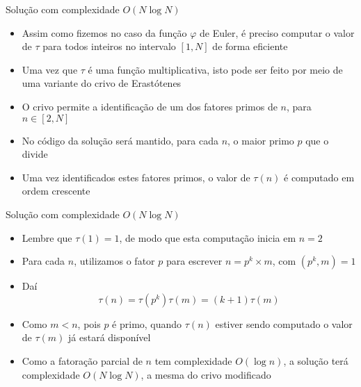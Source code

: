 \begin{frame}[fragile]{Solução com complexidade $O(N\log N)$}

    \begin{itemize}
        \item Assim como fizemos no caso da função $\varphi$ de Euler, é preciso computar o valor
            de $\tau$ para todos inteiros no intervalo $[1, N]$ de forma eficiente

        \item Uma vez que $\tau$ é uma função multiplicativa, isto pode ser feito por meio de
            uma variante do crivo de Erastótenes

        \item O crivo permite a identificação de um dos fatores primos de $n$, para $n\in [2, N]$

        \item No código da solução será mantido, para cada $n$, o maior primo $p$ que o divide

        \item Uma vez identificados estes fatores primos, o valor de $\tau(n)$ é computado em
            ordem crescente
    \end{itemize}

\end{frame}

\begin{frame}[fragile]{Solução com complexidade $O(N\log N)$}

    \begin{itemize}
        \item Lembre que $\tau(1) = 1$, de modo que esta computação inicia em $n = 2$

        \item Para cada $n$, utilizamos o fator $p$ para escrever $n = p^k \times m$, com
            $(p^k, m) = 1$

        \item Daí $$\tau(n) = \tau(p^k)\tau(m) = (k + 1)\tau(m)$$

        \item Como $m < n$, pois $p$ é primo, quando $\tau(n)$ estiver sendo computado o valor de
            $\tau(m)$ já estará disponível

        \item Como a fatoração parcial de $n$ tem complexidade $O(\log n)$, a solução terá 
            complexidade $O(N\log N)$, a mesma do crivo modificado
    \end{itemize}

\end{frame}

